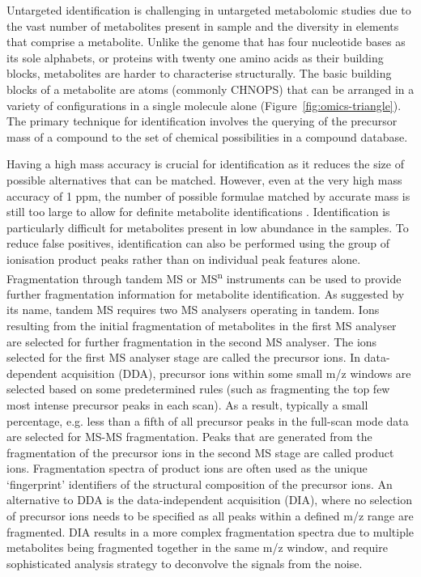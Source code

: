 Untargeted identification is challenging in untargeted metabolomic studies due to the vast number of metabolites present in sample and the diversity in elements that comprise a metabolite. Unlike the genome that has four nucleotide bases as its sole alphabets, or proteins with twenty one amino acids as their building blocks, metabolites are harder to characterise structurally. The basic building blocks of a metabolite are atoms (commonly CHNOPS) that can be arranged in a variety of configurations in a single molecule alone (Figure~\ref{fig:omics-triangle}). The primary technique for identification involves the querying of the precursor mass of a compound to the set of chemical possibilities in a compound database. %

Having a high mass accuracy is crucial for identification as it reduces the size of possible alternatives that can be matched. However, even at the very high mass accuracy of 1 ppm, the number of possible formulae matched by accurate mass is still too large to allow for definite metabolite identifications \cite{Kind2006}. Identification is particularly difficult for metabolites present in low abundance in the samples. To reduce false positives, identification can also be performed using the group of ionisation product peaks rather than on individual peak features alone. Fragmentation through tandem MS or MS\textsuperscript{n} instruments can be used to provide further fragmentation information for metabolite identification. As suggested by its name, tandem MS requires two MS analysers operating in tandem. Ions resulting from the initial fragmentation of metabolites in the first MS analyser are selected for further fragmentation in the second MS analyser. The ions selected for the first MS analyser stage are called the precursor ions. In data-dependent acquisition (DDA), precursor ions within some small m/z windows are selected based on some predetermined rules (such as fragmenting the top few most intense precursor peaks in each scan). As a result, typically a small percentage, e.g. less than a fifth of all precursor peaks in the full-scan mode data are selected for MS-MS fragmentation. Peaks that are generated from the fragmentation of the precursor ions in the second MS stage are called product ions. Fragmentation spectra of product ions are often used as the unique `fingerprint' identifiers of the structural composition of the precursor ions. An alternative to DDA is the data-independent acquisition (DIA), where no selection of precursor ions needs to be specified as all peaks within a defined m/z range are fragmented. DIA results in a more complex fragmentation spectra due to multiple metabolites being fragmented together in the same m/z window, and require sophisticated analysis strategy to deconvolve the signals from the noise.

